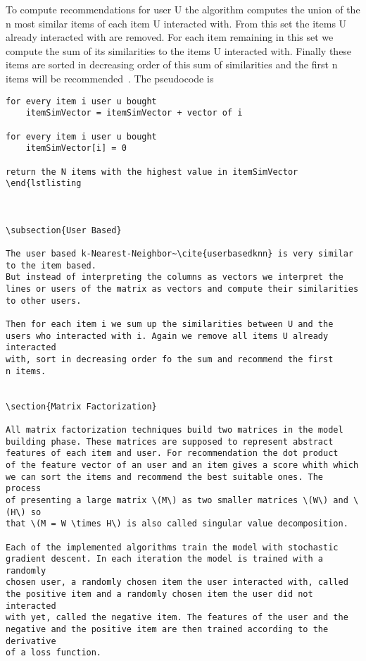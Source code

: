 To compute recommendations for user U the algorithm computes
the union of the n most similar items of each item U interacted with.
From this set the items U already interacted with are removed. For
each item remaining in this set we compute the sum of its similarities
to the items U interacted with. Finally these items are sorted in
decreasing order of this sum of similarities and the first n items
will be recommended~\cite{Karypis:2001:EIT:502585.502627}.
The pseudocode is
\begin{lstlisting}
for every item i user u bought
    itemSimVector = itemSimVector + vector of i

for every item i user u bought
    itemSimVector[i] = 0

return the N items with the highest value in itemSimVector
\end{lstlisting



\subsection{User Based}

The user based k-Nearest-Neighbor~\cite{userbasedknn} is very similar to the item based.
But instead of interpreting the columns as vectors we interpret the
lines or users of the matrix as vectors and compute their similarities
to other users.

Then for each item i we sum up the similarities between U and the
users who interacted with i. Again we remove all items U already interacted
with, sort in decreasing order fo the sum and recommend the first
n items.


\section{Matrix Factorization}

All matrix factorization techniques build two matrices in the model
building phase. These matrices are supposed to represent abstract
features of each item and user. For recommendation the dot product
of the feature vector of an user and an item gives a score whith which
we can sort the items and recommend the best suitable ones. The process
of presenting a large matrix \(M\) as two smaller matrices \(W\) and \(H\) so
that \(M = W \times H\) is also called singular value decomposition.

Each of the implemented algorithms train the model with stochastic
gradient descent. In each iteration the model is trained with a randomly
chosen user, a randomly chosen item the user interacted with, called
the positive item and a randomly chosen item the user did not interacted
with yet, called the negative item. The features of the user and the
negative and the positive item are then trained according to the derivative
of a loss function.



\end{lstlisting}

